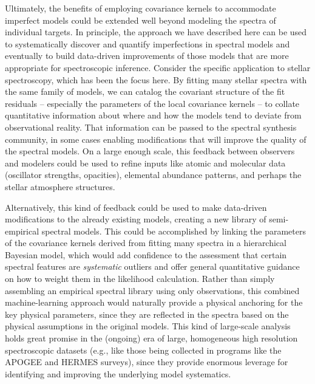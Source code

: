 \documentclass[iop,floatfix,twocolappendix]{emulateapj}
\begin{document}
Ultimately, the benefits of employing covariance kernels to accommodate imperfect models could 
be extended well beyond modeling the spectra of individual targets.  In principle, the approach we 
have described here can be used to systematically discover and quantify imperfections in spectral 
models and eventually to build data-driven improvements of those models that are more appropriate 
for spectroscopic inference.  Consider the specific application to stellar spectroscopy, which has 
been the focus here.  By fitting many stellar spectra with the same family of models, we can 
catalog the covariant structure of the fit residuals -- especially the parameters of the local 
covariance kernels -- to collate quantitative information about where and how the models tend to 
deviate from observational reality.  That information can be passed to the spectral synthesis 
community, in some cases enabling modifications that will improve the quality of the spectral 
models.  On a large enough scale, this feedback between observers and modelers could be used to 
refine inputs like atomic and molecular data (oscillator strengths, opacities), elemental abundance 
patterns, and perhaps the stellar atmosphere structures.

Alternatively, this kind of feedback could be used to make data-driven modifications to the already 
existing models, creating a new library of semi-empirical spectral models.  This could be 
accomplished by linking the parameters of the covariance kernels derived from fitting many spectra 
in a hierarchical Bayesian model, which would add confidence to the assessment that certain 
spectral features are {\it systematic} outliers and offer general quantitative guidance on how to 
weight them in the likelihood calculation.  Rather than simply assembling an empirical spectral 
library using only observations, this combined machine-learning approach would naturally provide a 
physical anchoring for the key physical parameters, since they are reflected in the spectra based 
on the physical assumptions in the original models.  This kind of large-scale analysis holds great 
promise in the (ongoing) era of large, homogeneous high resolution spectroscopic datasets (e.g., 
like those being collected in programs like the APOGEE and HERMES surveys), since they provide 
enormous leverage for identifying and improving the underlying model systematics. \\
\end{document}
